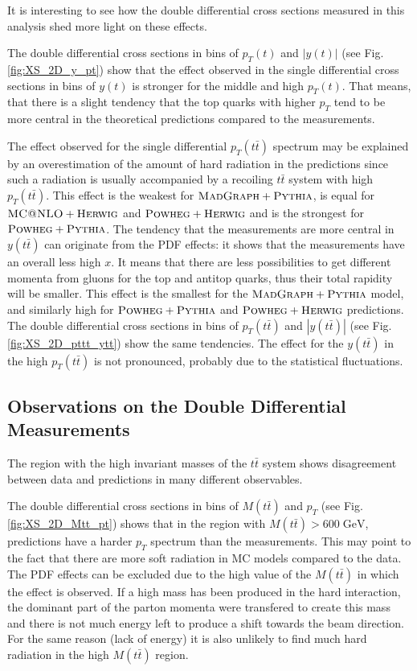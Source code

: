 It is interesting to see how the double differential cross sections measured in this analysis shed more light on these effects.

The double differential cross sections in bins of $p_{T}(t)$ and $|y(t)|$ (see Fig. \ref{fig:XS_2D_y_pt}) show that the effect observed in
the single differential cross sections in bins of $y(t)$ is stronger for the middle and high $p_{T}(t)$. That means, that there is a slight 
tendency that the top quarks with higher $p_{T}$ tend to be more central in the theoretical predictions compared to the measurements.

The effect observed for the single differential $p_{T}(t\bar{t})$ spectrum may be explained by an overestimation of the amount of hard radiation
in the predictions since such a radiation is usually accompanied by a recoiling $t\bar{t}$ system with high $p_{T}(t\bar{t})$. This effect is the weakest 
for $\textsc{MadGraph}+\textsc{Pythia}$, is equal for $\textsc{MC@NLO}+\textsc{Herwig}$ and $\textsc{Powheg}+\textsc{Herwig}$ and is the strongest for
$\textsc{Powheg}+\textsc{Pythia}$. The tendency that the measurements are more central in $y(t\bar{t})$ can originate from the PDF effects: it shows that the 
measurements have an overall less high $x$. It means that there are less possibilities to get different momenta from gluons for the top and antitop 
quarks, thus their total rapidity will be smaller. This effect is the smallest for the $\textsc{MadGraph}+\textsc{Pythia}$ model, and similarly high for $\textsc{Powheg}+\textsc{Pythia}$ and
$\textsc{Powheg}+\textsc{Herwig}$ predictions. The double differential cross sections in bins of $p_{T}(t\bar{t})$ and $|y(t\bar{t})|$ (see Fig. \ref{fig:XS_2D_pttt_ytt}) 
show the same tendencies. The effect for the $y(t\bar{t})$ in the high $p_{T}(t\bar{t})$ is not pronounced, probably due to the statistical fluctuations.

\subsection{Observations on the Double Differential Measurements}\label{sec:ddxsec_discuss}

The region with the high invariant masses of the $t\bar{t}$ system shows disagreement between data and predictions in many different observables.

The double differential cross sections in bins of $M(t\bar{t})$ and $p_{T}$ (see Fig. \ref{fig:XS_2D_Mtt_pt}) shows that in the region with 
$M(t\bar{t}) > 600\;\text{GeV}$, predictions have a harder $p_{T}$ spectrum than the measurements. This may point to the fact that there are 
more soft radiation in MC models compared to the data. The PDF effects can be excluded due to the high value of the $M(t\bar{t})$ in which
the effect is observed. If a high mass has been produced in the hard interaction, the dominant part of the parton momenta were transfered to
create this mass and there is not much energy left to produce a shift towards the beam direction. For the same reason (lack of energy) it is also 
unlikely to find much hard radiation in the high $M(t\bar{t})$ region. 

